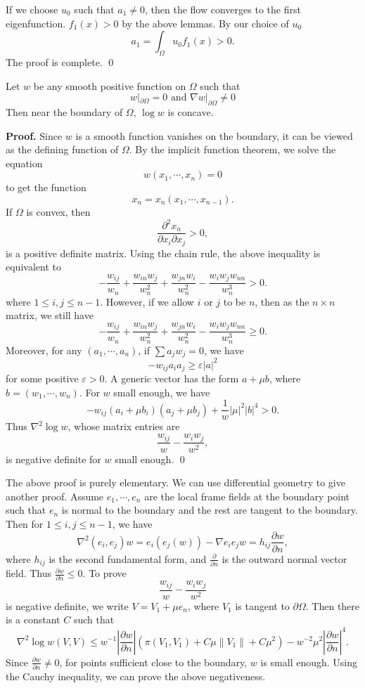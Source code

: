 If we choose $u_0$ such that $a_1 \neq 0$, then the flow converges to the first
eigenfunction. $f_1(x) > 0$ by the above lemmas. By our choice of $u_0$
\[
a_1 = \int_{\Omega} u_0 f_1(x) > 0.
\]
The proof is complete.
\qed

\begin{lemma}
Let $w$ be any smooth positive function on $\Omega$ such that
\[
w|_{\partial\Omega} = 0 \mbox{ and } \nabla w|_{\partial\Omega} \neq 0
\]
Then near the boundary of $\Omega$, $\log w$ is concave.
\end{lemma}
{\bf Proof.}
Since $w$ is a smooth function vanishes on the boundary, it can be viewed as the
defining function of $\Omega$. By the implicit function theorem, we solve the
equation
\[
w(x_1, \cdots, x_n) = 0
\]
to get the function
\[
x_n = x_n(x_1, \cdots, x_{n-1}).
\]
If $\Omega$ is convex, then
\[
\frac{\partial^2 x_n}{\partial x_i \partial x_j} > 0,
\]
is a positive definite matrix. Using the chain rule, the above inequality is
equivalent to
\[
-\frac{w_{ij}}{w_n} + \frac{w_{in} w_j}{w_n^2} + \frac{w_{jn} w_i}{w_n^2}
-\frac{w_i w_j w_{nn}}{w_n^3} > 0.
\]
where $1\leqslant i, j \leqslant n-1$. However, if we allow $i$ or $j$ to be
$n$, then as the $n\times n$ matrix, we still have
\[
-\frac{w_{ij}}{w_n} + \frac{w_{in}w_j}{w_n^2} + \frac{w_{jn}w_i}{w_n^2}
-\frac{w_i w_j w_{nn}}{w_n^3} \geqslant 0.
\]
Moreover, for any $(a_1, \cdots, a_n)$, if $\sum a_j w_j = 0$, we have
\[
-w_{ij} a_i a_j \geqslant \varepsilon |a|^2
\]
for some positive $\varepsilon > 0$. A generic vector has the form $a+\mu b$,
where $b = (w_1, \cdots, w_n)$. For $w$ small enough, we have
\[
-w_{ij}(a_i + \mu b_i)(a_j + \mu b_j) + \frac{1}{w} |\mu|^2 |b|^4 > 0.
\]
Thus $\nabla^2\log w$, whose matrix entries are
\[
\frac{w_{ij}}{w} - \frac{w_i w_j}{w^2},
\]
is negative definite for $w$ small enough.
\qed

\begin{remark}
The above proof is purely elementary. We can use differential geometry to give
another proof. Assume $e_1, \cdots, e_n$ are the local frame fields at the
boundary point such that $e_n$ is normal to the boundary and the rest are
tangent to the boundary. Then for $1\leqslant i, j \leqslant n-1$, we have
\[
\nabla^2 (e_i,e_j) w = e_i(e_j(w)) - \nabla e_i e_j w = h_{ij} 
\frac{\partial w}{\partial n},
\]
where $h_{ij}$ is the second fundamental form, and $\frac{\partial}{\partial n}$
is the outward normal vector field. Thus 
$\frac{\partial w}{\partial n} \leqslant 0$. To prove
\[
\frac{w_{ij}}{w} - \frac{w_i w_j}{w^2}
\]
is negative definite, we write $V=V_1 + \mu e_n$, where $V_1$ is tangent to
$\partial\Omega$. Then there is a constant $C$ such that
\[
\nabla^2 \log w(V,V) \leqslant w^{-1}\left|\frac{\partial w}{\partial n}\right|
(\pi(V_1, V_1) + C \mu \|V_1\| +C \mu^2) - 
w^{-2} \mu^2 \left|\frac{\partial w}{\partial n}\right|^4.
\]
Since $\frac{\partial w}{\partial n} \neq 0$, for points sufficient close to the
boundary, $w$ is small enough. Using the Cauchy inequality, we can prove the
above negativeness.
\end{remark}

